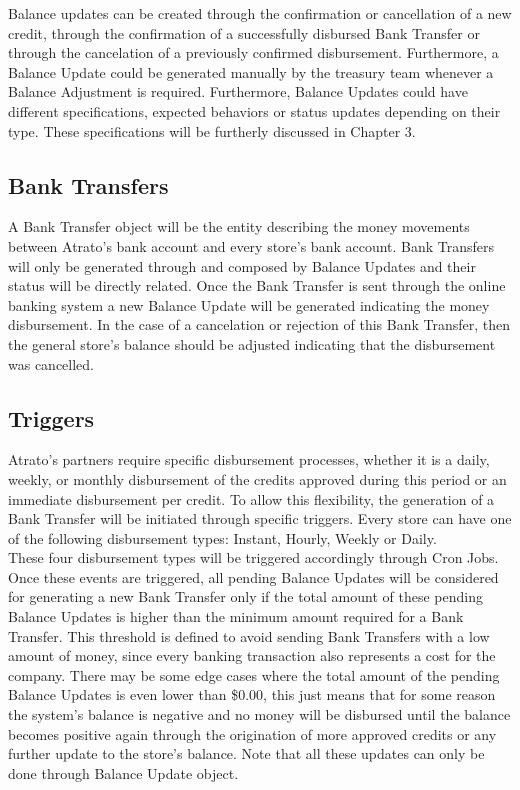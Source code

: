 Balance updates can be created through the confirmation or cancellation of a new credit, through the confirmation of a successfully disbursed Bank Transfer or through the cancelation of a previously confirmed disbursement. Furthermore, a Balance Update could be generated manually by the treasury team whenever a Balance Adjustment is required. Furthermore, Balance Updates could have different specifications, expected behaviors or status updates depending on their type. These specifications will be furtherly discussed in Chapter 3.

\subsection{Bank Transfers} 
A Bank Transfer object will be the entity describing the money movements between Atrato’s bank account and every store’s bank account. Bank Transfers will only be generated through and composed by Balance Updates and their status will be directly related. Once the Bank Transfer is sent through the online banking system a new Balance Update will be generated indicating the money disbursement. In the case of a cancelation or rejection of this Bank Transfer, then the general store's balance should be adjusted indicating that the disbursement was cancelled.

\subsection{Triggers}
Atrato’s partners require specific disbursement processes, whether it is a daily, weekly, or monthly disbursement of the credits approved during this period or an immediate disbursement per credit. To allow this flexibility, the generation of a Bank Transfer will be initiated through specific triggers. Every store can have one of the following disbursement types: Instant, Hourly, Weekly or Daily.\\

These four disbursement types will be triggered accordingly through Cron Jobs. Once these events are triggered, all pending Balance Updates will be considered for generating a new Bank Transfer only if the total amount of these pending Balance Updates is higher than the minimum amount required for a Bank Transfer. This threshold is defined to avoid sending Bank Transfers with a low amount of money, since every banking transaction also represents a cost for the company. There may be some edge cases where the total amount of the pending Balance Updates is even lower than \$0.00, this just means that for some reason the system’s balance is negative and no money will be disbursed until the balance becomes positive again through the origination of more approved credits or any further update to the store’s balance. Note that all these updates can only be done through Balance Update object.

